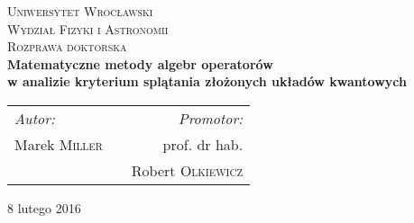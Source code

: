 \begin{titlepage}

\begin{center}

\textsc{\LARGE Uniwersytet Wrocławski}\\[0.5cm]
\textsc{\Large Wydział Fizyki i Astronomii} \\[1.5cm]
\textsc{\Large Rozprawa doktorska} \\[2cm]

{ \Large \bfseries
    Matematyczne metody algebr operatorów\\
    w analizie kryterium splątania
    złożonych układów kwantowych
}\\[3cm]

{ \large
\begin{center}
\begin{tabular}{lcr}
\emph{Autor:} & \hspace{3cm} & \emph{Promotor:}\\
Marek \textsc{Miller} & & prof. dr hab. \\
    & & Robert \textsc{Olkiewicz}
\end{tabular}
\end{center}
}

\vfill


{\large 8 lutego 2016}
\end{center}

\end{titlepage}
